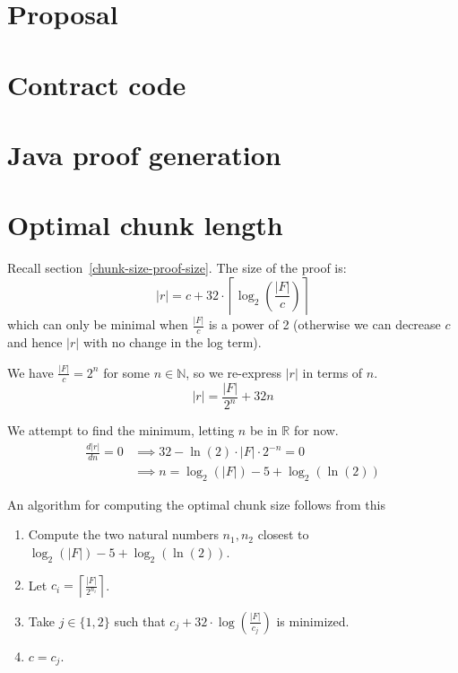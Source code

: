 \documentclass[12pt,a4paper,twoside,openright]{report}
\begin{document}
\begin{appendices}

\chapter{Proposal}



\chapter{Contract code} \label{app-contract}

\chapter{Java proof generation} \label{app-java}

\chapter{Optimal chunk length} \label{app-chunk-size}

Recall section~\ref{chunk-size-proof-size}.
The size of the proof is:
\[|r| = c + 32 \cdot \left\lceil\log_2\left(\frac{|F|}{c}\right)\right\rceil\]
which can only be minimal when $\frac{|F|}{c}$ is a power of 2 (otherwise we can decrease $c$ and hence $|r|$ with no change in the log term).

We have $\frac{|F|}{c} = 2^n$ for some $n \in \mathbb{N}$, so we re-express $|r|$ in terms of $n$.
\[|r| = \frac{|F|}{2^n} + 32 n\]

We attempt to find the minimum, letting $n$ be in $\mathbb{R}$ for now.
\begin{align*}
\frac{d |r|}{d n} = 0 &\implies 32 - \ln(2) \cdot |F| \cdot 2^{-n} = 0\\
&\implies n = \log_2(|F|) - 5 + \log_2(\ln(2))
\end{align*}

An algorithm for computing the optimal chunk size follows from this
\begin{enumerate}
\item Compute the two natural numbers $n_1, n_2$ closest to $\log_2(|F|) - 5 + \log_2(\ln(2))$.
\item Let $c_i = \left\lceil \frac{|F|}{2^{n_i}}\right\rceil$.
\item Take $j \in \{1, 2\}$ such that $c_j + 32 \cdot \log\left(\frac{|F|}{c_j}\right)$ is minimized.
\item $c = c_j$.
\end{enumerate}
\end{appendices}
\end{document}
